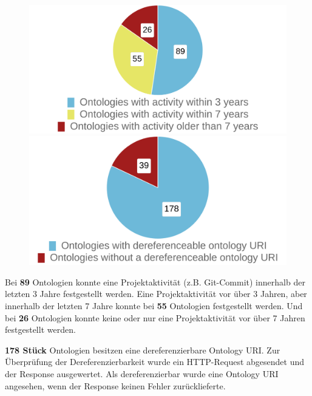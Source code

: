 \documentclass{article}
\begin{document}
\begin{figure}[H]
    \begin{minipage}[c]{0.4\linewidth}
        \includegraphics[scale=0.14]{pie-activity-37}
        \centering
        \caption{}
    \end{minipage}
    \hfill
    \begin{minipage}[c]{0.4\linewidth}
        \centering
        \includegraphics[scale=0.14]{pie-dereferenceable-ontology-uri}
        \caption{}
    \end{minipage}%
\end{figure}

Bei \textbf{89} Ontologien konnte eine Projektaktivität (z.B. Git-Commit) innerhalb der letzten 3 Jahre festgestellt werden.
Eine Projektaktivität vor über 3 Jahren, aber innerhalb der letzten 7 Jahre konnte bei \textbf{55} Ontologien festgestellt werden.
Und bei \textbf{26} Ontologien konnte keine oder nur eine Projektaktivität vor über 7 Jahren festgestellt werden.

\textbf{178 Stück} Ontologien besitzen eine dereferenzierbare Ontology URI.
Zur Überprüfung der Dereferenzierbarkeit wurde ein HTTP-Request abgesendet und der Response ausgewertet.
Als dereferenzierbar wurde eine Ontology URI angesehen, wenn der Response keinen Fehler zurücklieferte.
\end{document}
